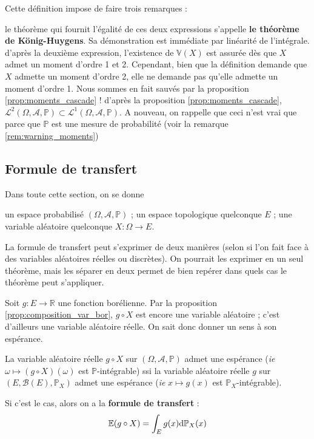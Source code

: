 \documentclass[../integ-proba.tex]{subfiles}
\begin{document}
\begin{rem}
    Cette définition impose de faire trois remarques :
    \begin{itemize}
        \itemb le théorème qui fournit l'égalité de ces deux expressions s'appelle \textbf{le théorème de König-Huygens}. Sa démonstration est immédiate par linéarité de l'intégrale.
        \itemb d'après la deuxième expression, l'existence de $\mathbb{V}(X)$ est assurée dès que $X$ admet un moment d'ordre 1 et 2.
        Cependant, bien que la définition demande que $X$ admette un moment d'ordre 2, elle ne demande pas qu'elle admette un moment d'ordre 1.
        Nous sommes en fait sauvés par la proposition \ref{prop:moments_cascade} !
        \itemb d'après la proposition \ref{prop:moments_cascade}, $\mathcal{L}^2\left(\Omega, \mathcal{A}, \mathbb{P}\right) \subset \mathcal{L}^1\left(\Omega, \mathcal{A}, \mathbb{P}\right)$.
        A nouveau, on rappelle que ceci n'est vrai que parce que $\mathbb{P}$ est une mesure de probabilité (voir la remarque \ref{rem:warning_moments})
    \end{itemize}
\end{rem}

\subsection{Formule de transfert}

Dans toute cette section, on se donne
\begin{itemize}
    \itemb un espace probabilisé $\left(\Omega, \mathcal{A}, \mathbb{P}\right)$ ;
    \itemb un espace topologique quelconque $E$ ;
    \itemb une variable aléatoire quelconque $X:\Omega \longrightarrow E$.
\end{itemize}

La formule de transfert peut s'exprimer de deux manières (selon si l'on fait face à des variables aléatoires réelles ou discrètes).
On pourrait les exprimer en un seul théorème, mais les séparer en deux permet de bien repérer dans quels cas le théorème peut s'appliquer.

\begin{thm}
    Soit $g:E \longrightarrow \mathbb{R}$ une fonction borélienne.
    Par la proposition \ref{prop:composition_var_bor}, $g \circ X$ est encore une variable aléatoire ; c'est d'ailleurs une variable aléatoire réelle.
    On sait donc donner un sens à son espérance.

    La variable aléatoire réelle $g \circ X$ sur $\left(\Omega, \mathcal{A}, \mathbb{P}\right)$ admet une espérance (\textit{ie} $\omega \mapsto (g \circ X)(\omega)$ est $\mathbb{P}$-intégrable) ssi la variable aléatoire réelle $g$ sur $\left(E, \mathcal{B}(E), \mathbb{P}_X\right)$ admet une espérance (\textit{ie} $x \mapsto g(x)$ est $\mathbb{P}_X$-intégrable).
    
    Si c'est le cas, alors on a la \textbf{formule de transfert} :
    $$
    \mathbb{E}(g \circ X) = \int_E g(x)\textnormal{d}\mathbb{P}_X(x)
    $$
\end{thm}
\end{document}
